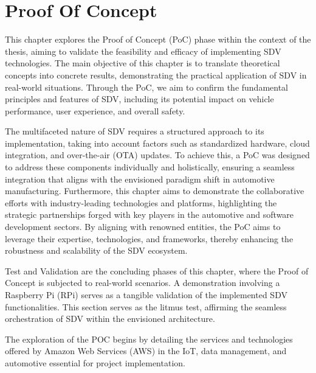  \lstset{numbers=left}
 
\chapter{Proof Of Concept} \label{ch:proofOfConcept}

This chapter explores the Proof of Concept (PoC) phase within the context of the thesis, aiming to validate the feasibility and efficacy of implementing SDV technologies. The main objective of this chapter is to translate theoretical concepts into concrete results, demonstrating the practical application of SDV in real-world situations. Through the PoC, we aim to confirm the fundamental principles and features of SDV, including its potential impact on vehicle performance, user experience, and overall safety.

The multifaceted nature of SDV requires a structured approach to its implementation, taking into account factors such as standardized hardware, cloud integration, and over-the-air (OTA) updates. To achieve this, a PoC was designed to address these components individually and holistically, ensuring a seamless integration that aligns with the envisioned paradigm shift in automotive manufacturing. Furthermore, this chapter aims to demonstrate the collaborative efforts with industry-leading technologies and platforms, highlighting the strategic partnerships forged with key players in the automotive and software development sectors. By aligning with renowned entities, the PoC aims to leverage their expertise, technologies, and frameworks, thereby enhancing the robustness and scalability of the SDV ecosystem.

Test and Validation are the concluding phases of this chapter, where the Proof of Concept is subjected to real-world scenarios. A demonstration involving a Raspberry Pi (RPi) serves as a tangible validation of the implemented SDV functionalities. This section serves as the litmus test, affirming the seamless orchestration of SDV within the envisioned architecture.

The exploration of the POC begins by detailing the services and technologies offered by Amazon Web Services (AWS) in the IoT, data management, and automotive essential for project implementation.

